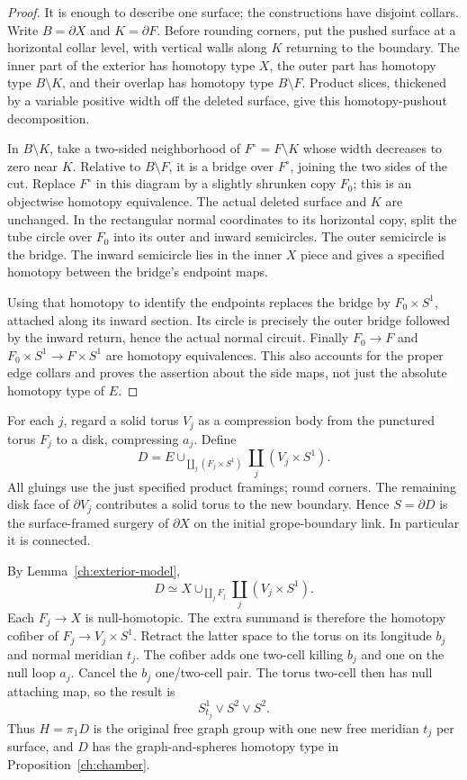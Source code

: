 \begin{proof}
It is enough to describe one surface; the constructions have disjoint
collars.  Write $B=\partial X$ and $K=\partial F$.  Before rounding
corners, put the pushed surface at a horizontal collar level, with
vertical walls along $K$ returning to the boundary.  The inner part of
the exterior has homotopy type $X$, the outer part has homotopy type
$B\setminus K$, and their overlap has homotopy type $B\setminus F$.
Product slices, thickened by a variable positive width off the deleted
surface, give this homotopy-pushout decomposition.

In $B\setminus K$, take a two-sided neighborhood of
$F^\circ=F\setminus K$ whose width decreases to zero near $K$.
Relative to $B\setminus F$, it is a bridge over $F^\circ$, joining
the two sides of the cut.  Replace $F^\circ$ in this diagram by a
slightly shrunken copy $F_0$; this is an objectwise homotopy equivalence.
The actual deleted surface and $K$ are unchanged.  In the rectangular
normal coordinates to its horizontal copy, split the tube circle over
$F_0$ into its outer and inward semicircles.  The outer semicircle is
the bridge.  The inward semicircle lies in the inner $X$ piece and
gives a specified homotopy between the bridge's endpoint maps.

Using that homotopy to identify the endpoints replaces the bridge by
$F_0\times S^1$, attached along its inward section.  Its circle is
precisely the outer bridge followed by the inward return, hence the
actual normal circuit.  Finally $F_0\to F$ and
$F_0\times S^1\to F\times S^1$ are homotopy equivalences.  This
also accounts for the proper edge collars and proves the assertion
about the side maps, not just the absolute homotopy type of $E$.
\end{proof}

For each $j$, regard a solid torus $V_j$ as a compression body from
the punctured torus $F_j$ to a disk, compressing $a_j$.  Define
\[
 D=E\cup_{\coprod_j(F_j\times S^1)}
                  \coprod_j(V_j\times S^1).
\]
All gluings use the just specified product framings; round corners.
The remaining disk face of $\partial V_j$ contributes a solid torus
to the new boundary.  Hence $S=\partial D$ is the surface-framed
surgery of $\partial X$ on the initial grope-boundary link.  In
particular it is connected.

By Lemma~\ref{ch:exterior-model},
\[
 D\simeq X\cup_{\coprod_jF_j}\coprod_j(V_j\times S^1).
\]
Each $F_j\to X$ is null-homotopic.  The extra summand is therefore
the homotopy cofiber of $F_j\to V_j\times S^1$.  Retract the latter
space to the torus on its longitude $b_j$ and normal meridian $t_j$.
The cofiber adds one two-cell killing $b_j$ and one on the null loop
$a_j$.  Cancel the $b_j$ one/two-cell pair.  The torus two-cell then
has null attaching map, so the result is
\[
 S^1_{t_j}\vee S^2\vee S^2.
\]
Thus $H=\pi_1D$ is the original free graph group with one new free
meridian $t_j$ per surface, and $D$ has the graph-and-spheres homotopy
type in Proposition~\ref{ch:chamber}.

